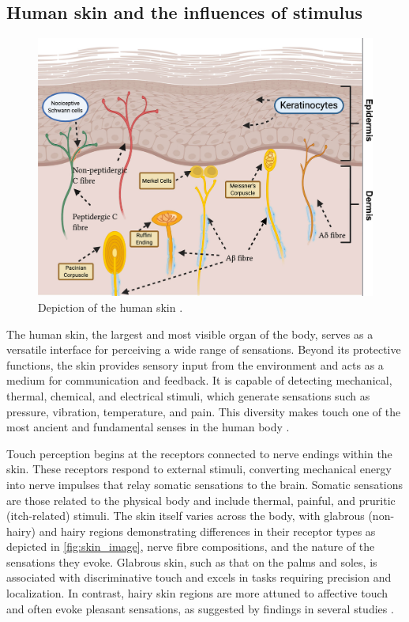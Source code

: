 \subsection*{Human skin and the influences of stimulus}
\begin{figure}
    \centering
    \includegraphics[width=0.7\linewidth]{src//pictures/skin.jpg}
    \caption{Depiction of the human skin \cite{lowy2021cutaneous}.}
    \label{fig:skin_image}
\end{figure}

The human skin, the largest and most visible organ of the body, serves as a versatile interface for perceiving a wide range of sensations. Beyond its protective functions, the skin provides sensory input from the environment and acts as a medium for communication and feedback. It is capable of detecting mechanical, thermal, chemical, and electrical stimuli, which generate sensations such as pressure, vibration, temperature, and pain. This diversity makes touch one of the most ancient and fundamental senses in the human body \cite{Fang2023}.

Touch perception begins at the receptors connected to nerve endings within the skin. These receptors respond to external stimuli, converting mechanical energy into nerve impulses that relay somatic sensations to the brain. Somatic sensations are those related to the physical body and include thermal, painful, and pruritic (itch-related) stimuli. The skin itself varies across the body, with glabrous (non-hairy) and hairy regions demonstrating differences in their receptor types as depicted in \autoref{fig:skin_image}, nerve fibre compositions, and the nature of the sensations they evoke. Glabrous skin, such as that on the palms and soles, is associated with discriminative touch and excels in tasks requiring precision and localization. In contrast, hairy skin regions are more attuned to affective touch and often evoke pleasant sensations, as suggested by findings in several studies \cite{Fang2023, ackerley2014quantifying,ackerley2016touch}.

